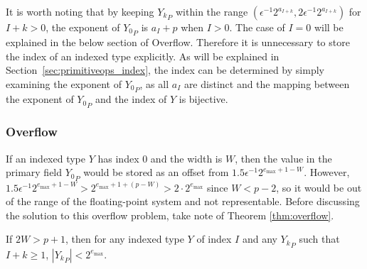       It is worth noting that by keeping ${Y_k}_P$ within the range
      \(
      	(\epsilon^{-1} 2^{a_{I + k}}, 2 \epsilon^{-1} 2^{a_{I + k}})
      \)
      for $I+k > 0$, the exponent of ${Y_0}_P$ is $a_I + p$ when $I > 0$.
      The case of $I = 0$ will be explained in the below section of Overflow.
      Therefore it is unnecessary to store the index of an indexed type explicitly.
      As will be explained in
      Section~\ref{sec:primitiveops_index}, the index can be determined by
      simply examining the exponent of ${Y_0}_P$, as all $a_I$ are distinct and
      the mapping between the exponent of ${Y_0}_P$ and the index of $Y$ is
      bijective.

    \subsubsection{Overflow}
      \label{sec:indexed_overflow}
      If an indexed type $Y$ has index 0 and the width is $W$, then the value
      in the primary field ${Y_0}_P$ would be stored as an offset from
      $1.5\epsilon^{-1}2^{e_{\max} + 1 - W}$. However,
      \(
        1.5\epsilon^{-1}2^{e_{\max} + 1 - W} > 2^{e_{\max} + 1 + (p - W)}
            > 2 \cdot 2^{e_{\max}}
      \) since $W < p - 2$, so it would be out of the range of the
      floating-point system and not representable. Before discussing the
      solution to this overflow problem, take note of Theorem
      \ref{thm:overflow}.

      \begin{samepage}
      \begin{thm}
        If $2 W > p + 1$, then for any indexed type $Y$ of index $I$ and any ${Y_k}_P$ such that $I + k \geq 1$, $|{Y_k}_P| < 2^{e_{\max}}$.
        \label{thm:overflow}
      \end{thm}
    \end{samepage}

